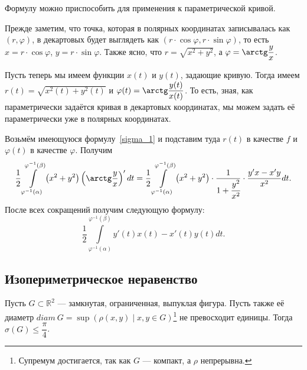 \begin{remark}
	Формулу можно приспособить для применения к параметрической кривой.
	
	Прежде заметим, что точка, которая в полярных координатах записывалась как \((r, \varphi)\), в декартовых будет выглядеть как \((r \cdot \cos \varphi, r \cdot \sin \varphi)\), то есть \(x = r \cdot \cos \varphi\), \(y = r \cdot \sin \varphi\). Также ясно, что \(r = \sqrt{x^2 + y^2}\), а \(\varphi = \arctg \dfrac{y}{x}\).
	
	Пусть теперь мы имеем функции \(x(t)\) и \(y(t)\), задающие кривую. Тогда имеем \(r(t) = \sqrt{x^2(t) + y^2(t)}\) и \(\varphi(t) = \arctg \dfrac{y(t)}{x(t)}\). То есть, зная, как параметрически задаётся кривая в декартовых координатах, мы можем задать её параметрически уже в полярных координатах.
	
	Возьмём имеющуюся формулу~\eqref{sigma_1} и подставим туда \(r(t)\) в качестве \(f\) и \(\varphi(t)\) в качестве \(\varphi\).  Получим \[
		\frac{1}{2}\int\limits_{\varphi^{-1}(\alpha)}^{\varphi^{-1}(\beta)} \left(x^2 + y^2 \right) \left(\arctg \frac{y}{x}\right)' dt
		= \frac{1}{2}\int\limits_{\varphi^{-1}(\alpha)}^{\varphi^{-1}(\beta)} \left(x^2 + y^2 \right) \cdot \frac{1}{1 + \cfrac{y^2}{x^2}} \cdot \frac{y'x - x'y}{x^2} dt.
	\]
	После всех сокращений получим следующую формулу: \[
		\frac{1}{2}\int\limits_{\varphi^{-1}(\alpha)}^{\varphi^{-1}(\beta)} y'(t)x(t) - x'(t)y(t) dt.
	\]
\end{remark}

\subsection{Изопериметрическое неравенство}

\begin{example}
	Пусть \(G \subset \mathbb{R}^2\) --- замкнутая, ограниченная, выпуклая фигура. Пусть также её диаметр \(diam \ G = \sup \left(\rho(x, y) \mid x, y \in G \right)\)\footnote{Супремум достигается, так как \(G\) --- компакт, а \(\rho\) непрерывна.} не превосходит единицы. Тогда \(\sigma(G) \leqslant \dfrac{\pi}{4}\).
\end{example}

